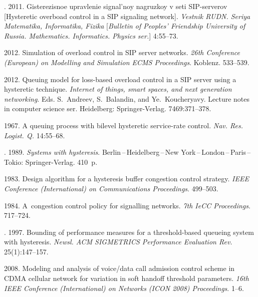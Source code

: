\begin{multicols}{2}
{{\begin{thebibliography}{99}
. 
2011. Gisterezisnoe upravlenie signal'noy nagruzkoy v seti SIP-serverov 
[Hysteretic overboad control in a SIP signaling network].
\textit{Vestnik RUDN. Seriya Matematika, Informatika, Fizika}
 [\textit{Bulletin of Peoples' Friendship University of Russia. 
 Mathematics. Informatics. Physics ser.}] 4:55--73.

 2012.
Simulation of overload control in SIP server
networks. \textit{26th  Conference (European) on Modelling and
Simulation ECMS Proceedings}. Koblenz. 533--539.

 2012.
Queuing model for loss-based overload control in a SIP
server using a hysteretic technique. \textit{Internet of things, smart spaces, and
next generation networking}. Eds. S.~Andreev, S.~Balandin, and Ye.~Koucheryavy.
Lecture notes in computer science ser.
Heidelberg: Springer-Verlag.
7469:371--378.

 1967. 
A queuing process with bilevel hysteretic
service-rate control. \textit{Nav. Res. Logist. Q.} 14:55--68.

. 1989. 
\textit{Systems with hysteresis}. 
Berlin\,--\,Heidelberg\,--\,New York\,--\,London\,--\,Paris\,--\,Tokio: Springer-Verlag. 410~p.

 1983.
Design algorithm for a hysteresis buffer
congestion control strategy. \textit{IEEE  Conference (International) on
Communications Proceedings}. 499--503.

 1984.
A~congestion control policy for signalling
networks. \textit{7th IeCC Proceedings}. 717--724.

.  1997.
Bounding of performance measures for a
threshold-based queueing system with hysteresis. \textit{Newsl. ACM SIGMETRICS 
Performance Evaluation Rev.} 25(1):147--157.

 2008. 
Modeling and analysis of voice/data call admission
control scheme in CDMA cellular network for
variation in soft handoff threshold parameters. 
\textit{16th IEEE  Conference (International) on Networks
(ICON 2008) Proceedings}. 1--6.


\end{thebibliography}}}
\end{multicols}
